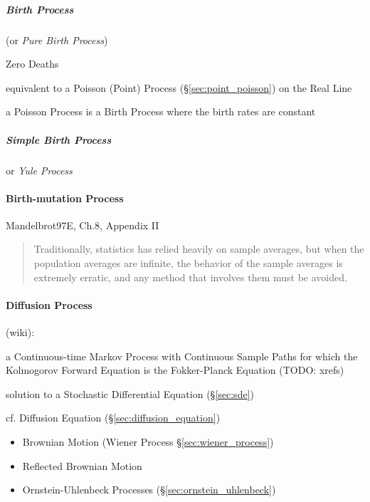 \subparagraph{Birth Process}\label{sec:birth_process}\hfill

(or \emph{Pure Birth Process})

Zero Deaths

equivalent to a Poisson (Point) Process (\S\ref{sec:point_poisson}) on the Real
Line

a Poisson Process is a Birth Process where the birth rates are constant



\subparagraph{Simple Birth Process}\label{sec:simple_birth_process}\hfill

or \emph{Yule Process}



\paragraph{Birth-mutation Process}\label{sec:birth_mutation}\hfill

Mandelbrot97E, Ch.8, Appendix II

\begin{quote}
  Traditionally, statistics has relied heavily on sample averages, but when the
  population averages are infinite, the behavior of the sample averages is
  extremely erratic, and any method that involves them must be avoided.
\end{quote}



\paragraph{Diffusion Process}\label{sec:diffusion_process}\hfill

(wiki):

a Continuous-time Markov Process with Continuous Sample Paths for which the
Kolmogorov Forward Equation is the Fokker-Planck Equation (TODO: xrefs)

solution to a Stochastic Differential Equation (\S\ref{sec:sde})

cf. Diffusion Equation (\S\ref{sec:diffusion_equation})

\begin{itemize}
  \item Brownian Motion (Wiener Process \S\ref{sec:wiener_process})
  \item Reflected Brownian Motion
  \item Ornstein-Uhlenbeck Processes (\S\ref{sec:ornstein_uhlenbeck})
\end{itemize}



